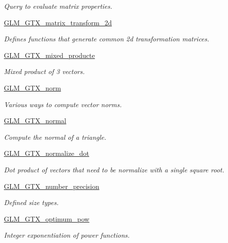 \begin{DoxyCompactItemize}
\begin{DoxyCompactList}\small\item\em Query to evaluate matrix properties. \end{DoxyCompactList}\item 
\hyperlink{group__gtx__matrix__transform__2d}{G\-L\-M\-\_\-\-G\-T\-X\-\_\-matrix\-\_\-transform\-\_\-2d}
\begin{DoxyCompactList}\small\item\em Defines functions that generate common 2d transformation matrices. \end{DoxyCompactList}\item 
\hyperlink{group__gtx__mixed__product}{G\-L\-M\-\_\-\-G\-T\-X\-\_\-mixed\-\_\-producte}
\begin{DoxyCompactList}\small\item\em Mixed product of 3 vectors. \end{DoxyCompactList}\item 
\hyperlink{group__gtx__norm}{G\-L\-M\-\_\-\-G\-T\-X\-\_\-norm}
\begin{DoxyCompactList}\small\item\em Various ways to compute vector norms. \end{DoxyCompactList}\item 
\hyperlink{group__gtx__normal}{G\-L\-M\-\_\-\-G\-T\-X\-\_\-normal}
\begin{DoxyCompactList}\small\item\em Compute the normal of a triangle. \end{DoxyCompactList}\item 
\hyperlink{group__gtx__normalize__dot}{G\-L\-M\-\_\-\-G\-T\-X\-\_\-normalize\-\_\-dot}
\begin{DoxyCompactList}\small\item\em Dot product of vectors that need to be normalize with a single square root. \end{DoxyCompactList}\item 
\hyperlink{group__gtx__number__precision}{G\-L\-M\-\_\-\-G\-T\-X\-\_\-number\-\_\-precision}
\begin{DoxyCompactList}\small\item\em Defined size types. \end{DoxyCompactList}\item 
\hyperlink{group__gtx__optimum__pow}{G\-L\-M\-\_\-\-G\-T\-X\-\_\-optimum\-\_\-pow}
\begin{DoxyCompactList}\small\item\em Integer exponentiation of power functions. \end{DoxyCompactList}\item 

\end{DoxyCompactItemize}
